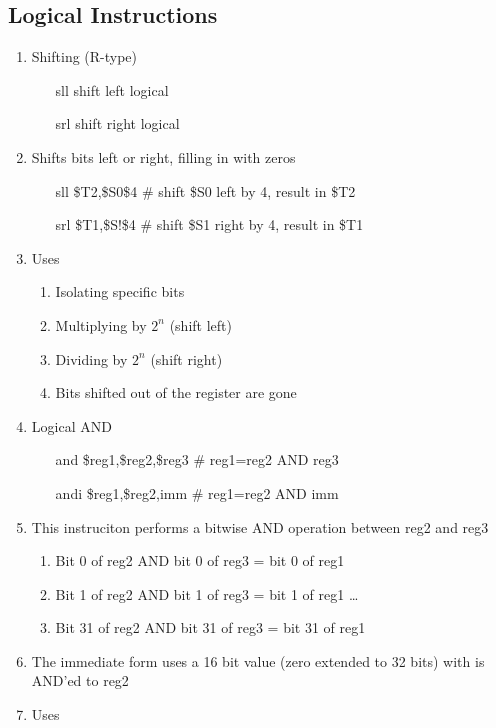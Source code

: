 \documentclass[12pt]{article}
\begin{document}
\subsection{Logical Instructions}
\begin{enumerate}
  \item Shifting (R-type)
  \begin{enumerate}
    \item[sll] shift left logical
    \item[srl] shift right logical
  \end{enumerate}
  \item Shifts bits left or right, filling in with zeros
  \begin{enumerate}
    \item[sll] \$T2,\$S0\$4 \# shift \$S0 left by 4, result in \$T2
    \item[srl] \$T1,\$S!\$4 \# shift \$S1 right by 4, result in \$T1
  \end{enumerate}
  \item Uses
  \begin{enumerate}
    \item Isolating specific bits
    \item Multiplying by $2^n$ (shift left)
    \item Dividing by $2^n$ (shift right)
    \item Bits shifted out of the register are gone
  \end{enumerate}
  \item Logical AND
  \begin{enumerate}
    \item[and] \$reg1,\$reg2,\$reg3 \# reg1=reg2 AND reg3
    \item[andi] \$reg1,\$reg2,imm \# reg1=reg2 AND imm
  \end{enumerate}
  \item This instruciton performs a bitwise AND operation between reg2 and reg3
  \begin{enumerate}
    \item Bit 0 of reg2 AND bit 0 of reg3 = bit 0 of reg1
    \item Bit 1 of reg2 AND bit 1 of reg3 = bit 1 of reg1 \dots
    \item Bit 31 of reg2 AND bit 31 of reg3 = bit 31 of reg1
  \end{enumerate}
  \item The immediate form uses a 16 bit value (zero extended to 32 bits) with is AND'ed to reg2
  \item Uses

\end{enumerate}
\end{document}
